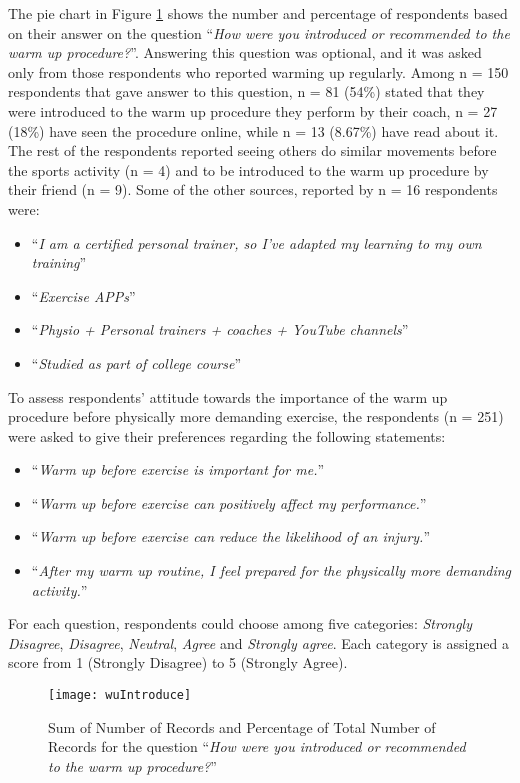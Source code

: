 The pie chart in Figure \ref{fig:wuIntroduce} shows the number and percentage of respondents based on their answer on the question ``\textit{How were you introduced or recommended to the warm up procedure?}''. Answering this question was optional, and it was asked only from those respondents who reported warming up regularly. Among n = 150 respondents that gave answer to this question, n = 81 (54\%) stated that they were introduced to the warm up procedure they perform by their coach, n = 27 (18\%) have seen the procedure online, while n = 13 (8.67\%) have read about it. The rest of the respondents reported seeing others do similar movements before the sports activity (n = 4) and to be introduced to the warm up procedure by their friend (n = 9). Some of the other sources, reported by n = 16 respondents were:
\begin{itemize}
\item ``\textit{I am a certified personal trainer, so I've adapted my learning to my own training}''
\item  ``\textit{Exercise APPs}''
\item  ``\textit{Physio + Personal trainers + coaches + YouTube channels}''
\item  ``\textit{Studied as part of college course}''
\end{itemize}
To assess respondents' attitude towards the importance of the warm up procedure before physically more demanding exercise, the respondents (n = 251) were asked to give their preferences regarding the following statements: 
\begin{itemize}
\item ``\textit{Warm up before exercise is important for me.}''
\item  ``\textit{Warm up before exercise can positively affect my performance.}''
\item  ``\textit{Warm up before exercise can reduce the likelihood of an injury.}''
\item  ``\textit{After my warm up routine, I feel prepared for the physically more demanding activity.}''
\end{itemize}
For each question, respondents could choose among five categories: \textit{Strongly Disagree}, \textit{Disagree}, \textit{Neutral}, \textit{Agree} and \textit{Strongly agree}. Each category is assigned a score from 1 (Strongly Disagree) to 5 (Strongly Agree). \begin{figure}[h]
    \centering
    \texttt{[image: wuIntroduce]}
    \caption[Results for  warm up related question.]{Sum of Number of Records and Percentage of Total Number of Records for the question ``\textit{How were you introduced or recommended to the warm up procedure?}''}
    \label{fig:wuIntroduce}
\end{figure}\\
